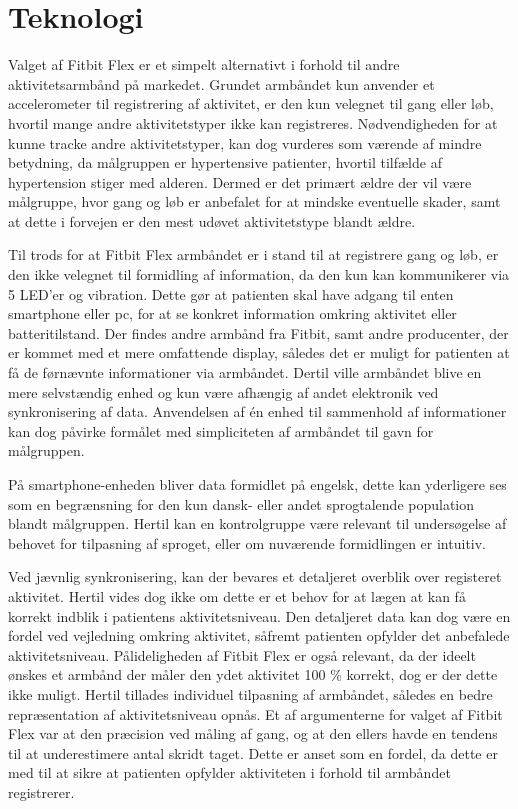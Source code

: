 \section{Teknologi} \label{sec:dis_teknologi}
Valget af Fitbit Flex er et simpelt alternativt i forhold til andre aktivitetsarmbånd på markedet. 
Grundet armbåndet kun anvender et accelerometer til registrering af aktivitet, er den kun velegnet til gang eller løb, hvortil mange andre aktivitetstyper ikke kan registreres. 
Nødvendigheden for at kunne tracke andre aktivitetstyper, kan dog vurderes som værende af mindre betydning, da målgruppen er hypertensive patienter, hvortil tilfælde af hypertension stiger med alderen. 
Dermed er det primært ældre der vil være målgruppe, hvor gang og løb er anbefalet for at mindske eventuelle skader, samt at dette i forvejen er den mest udøvet aktivitetstype blandt ældre. 

Til trods for at Fitbit Flex armbåndet er i stand til at registrere gang og løb, er den ikke velegnet til formidling af information, da den kun kan kommunikerer via 5 LED’er og vibration. 
Dette gør at patienten skal have adgang til enten smartphone eller pc, for at se konkret information omkring aktivitet eller batteritilstand. 
Der findes andre armbånd fra Fitbit, samt andre producenter, der er kommet med et mere omfattende display, således det er muligt for patienten at få de førnævnte informationer via armbåndet. 
Dertil ville armbåndet blive en mere selvstændig enhed og kun være afhængig af andet elektronik ved synkronisering af data. 
Anvendelsen af én enhed til sammenhold af informationer kan dog påvirke formålet med simpliciteten af armbåndet til gavn for målgruppen. 

På smartphone-enheden bliver data formidlet på engelsk, dette kan yderligere ses som en begrænsning for den kun dansk- eller andet sprogtalende population blandt målgruppen. 
Hertil kan en kontrolgruppe være relevant til undersøgelse af behovet for tilpasning af sproget, eller om nuværende formidlingen er intuitiv. 

Ved jævnlig synkronisering, kan der bevares et detaljeret overblik over registeret aktivitet. 
Hertil vides dog ikke om dette er et behov for at lægen at kan få korrekt indblik i patientens aktivitetsniveau. 
Den detaljeret data kan dog være en fordel ved vejledning omkring aktivitet, såfremt patienten opfylder det anbefalede aktivitetsniveau. 
Pålideligheden af Fitbit Flex er også relevant, da der ideelt ønskes et armbånd der måler den ydet aktivitet 100 \% korrekt, dog er der dette ikke muligt. 
Hertil tillades individuel tilpasning af armbåndet, således en bedre repræsentation af aktivitetsniveau opnås. 
Et af argumenterne for valget af Fitbit Flex var at den præcision ved måling af gang, og at den ellers havde en tendens til at underestimere antal skridt taget. 
Dette er anset som en fordel, da dette er med til at sikre at patienten opfylder aktiviteten i forhold til armbåndet registrerer. 


